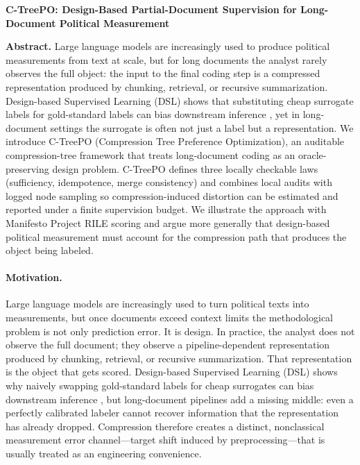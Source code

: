 \documentclass[11pt]{article}
\begin{document}
\begin{center}
{\Large\bf C-TreePO: Design-Based Partial-Document Supervision for Long-Document Political Measurement}
\end{center}

\textbf{Abstract.} Large language models are increasingly used to produce political measurements from text at scale, but for long documents the analyst rarely observes the full object: the input to the final coding step is a compressed representation produced by chunking, retrieval, or recursive summarization. Design-based Supervised Learning (DSL) shows that substituting cheap surrogate labels for gold-standard labels can bias downstream inference \citep{EgamiEtAl2024}, yet in long-document settings the surrogate is often not just a label but a representation. We introduce C-TreePO (Compression Tree Preference Optimization), an auditable compression-tree framework that treats long-document coding as an oracle-preserving design problem. C-TreePO defines three locally checkable laws (sufficiency, idempotence, merge consistency) and combines local audits with logged node sampling so compression-induced distortion can be estimated and reported under a finite supervision budget. We illustrate the approach with Manifesto Project RILE scoring \citep{ManifestoProject2025a} and argue more generally that design-based political measurement must account for the compression path that produces the object being labeled.

\paragraph{Motivation.}
Large language models are increasingly used to turn political texts into measurements, but once documents exceed context limits the methodological problem is not only prediction error. It is design. In practice, the analyst does not observe the full document; they observe a pipeline-dependent representation produced by chunking, retrieval, or recursive summarization. That representation is the object that gets scored. Design-based Supervised Learning (DSL) shows why naively swapping gold-standard labels for cheap surrogates can bias downstream inference \citep{EgamiEtAl2024}, but long-document pipelines add a missing middle: even a perfectly calibrated labeler cannot recover information that the representation has already dropped. Compression therefore creates a distinct, nonclassical measurement error channel---target shift induced by preprocessing---that is usually treated as an engineering convenience.
\end{document}
